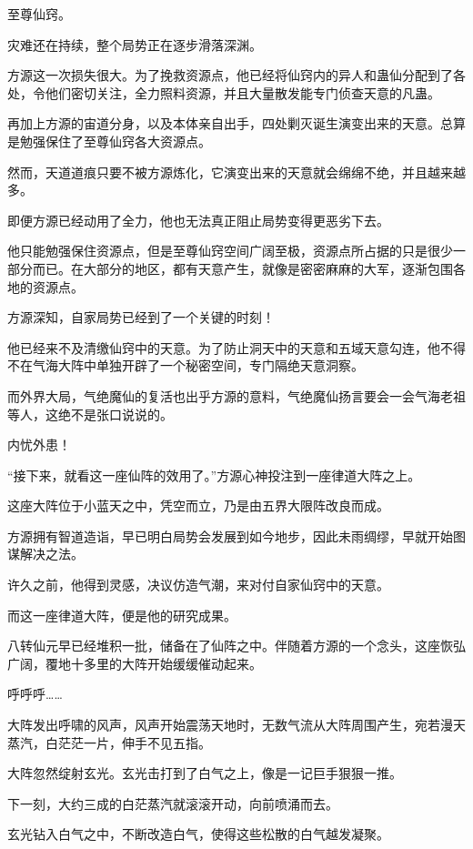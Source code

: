 
\begin{this_body}

至尊仙窍。

灾难还在持续，整个局势正在逐步滑落深渊。

方源这一次损失很大。为了挽救资源点，他已经将仙窍内的异人和蛊仙分配到了各处，令他们密切关注，全力照料资源，并且大量散发能专门侦查天意的凡蛊。

再加上方源的宙道分身，以及本体亲自出手，四处剿灭诞生演变出来的天意。总算是勉强保住了至尊仙窍各大资源点。

然而，天道道痕只要不被方源炼化，它演变出来的天意就会绵绵不绝，并且越来越多。

即便方源已经动用了全力，他也无法真正阻止局势变得更恶劣下去。

他只能勉强保住资源点，但是至尊仙窍空间广阔至极，资源点所占据的只是很少一部分而已。在大部分的地区，都有天意产生，就像是密密麻麻的大军，逐渐包围各地的资源点。

方源深知，自家局势已经到了一个关键的时刻！

他已经来不及清缴仙窍中的天意。为了防止洞天中的天意和五域天意勾连，他不得不在气海大阵中单独开辟了一个秘密空间，专门隔绝天意洞察。

而外界大局，气绝魔仙的复活也出乎方源的意料，气绝魔仙扬言要会一会气海老祖等人，这绝不是张口说说的。

内忧外患！

“接下来，就看这一座仙阵的效用了。”方源心神投注到一座律道大阵之上。

这座大阵位于小蓝天之中，凭空而立，乃是由五界大限阵改良而成。

方源拥有智道造诣，早已明白局势会发展到如今地步，因此未雨绸缪，早就开始图谋解决之法。

许久之前，他得到灵感，决议仿造气潮，来对付自家仙窍中的天意。

而这一座律道大阵，便是他的研究成果。

八转仙元早已经堆积一批，储备在了仙阵之中。伴随着方源的一个念头，这座恢弘广阔，覆地十多里的大阵开始缓缓催动起来。

呼呼呼……

大阵发出呼啸的风声，风声开始震荡天地时，无数气流从大阵周围产生，宛若漫天蒸汽，白茫茫一片，伸手不见五指。

大阵忽然绽射玄光。玄光击打到了白气之上，像是一记巨手狠狠一推。

下一刻，大约三成的白茫蒸汽就滚滚开动，向前喷涌而去。

玄光钻入白气之中，不断改造白气，使得这些松散的白气越发凝聚。


\end{this_body}
